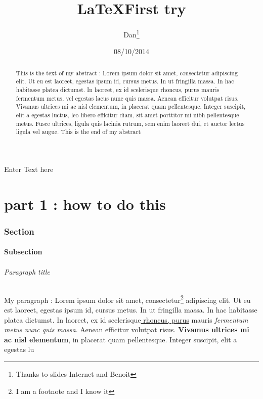 \documentclass[12pt]{article}
\title{\LaTeX First try}
\author{Dan\thanks{Thanks to slides Internet and Benoit}}
\date{08/10/2014}
\begin{document}
\maketitle
\begin{abstract}
This is the text of my abstract :
Lorem ipsum dolor sit amet, consectetur adipiscing elit. Ut eu est laoreet, egestas ipsum id, cursus metus. In ut fringilla massa. In hac habitasse platea dictumst. In laoreet, ex id scelerisque rhoncus, purus mauris fermentum metus, vel egestas lacus nunc quis massa. Aenean efficitur volutpat risus. Vivamus ultrices mi ac nisl elementum, in placerat quam pellentesque. Integer suscipit, elit a egestas luctus, leo libero efficitur diam, sit amet porttitor mi nibh pellentesque metus. Fusce ultrices, ligula quis lacinia rutrum, sem enim laoreet dui, et auctor lectus ligula vel augue.\newline
This is the end of my abstract
\end{abstract}

Enter Text here

\newpage
\tableofcontents
\newpage

\part{part 1 : how to do this}
\section{Section}
\subsection{Subsection}
\paragraph{Paragraph title}

My paragraph : Lorem ipsum dolor sit amet, consectetur\footnote{I am a footnote and I know it} adipiscing elit. Ut eu est laoreet, egestas ipsum id, cursus metus. In ut fringilla massa. In hac habitasse platea dictumst. In laoreet, ex id scelerisque\underline{ rhoncus, purus} mauris \textit{fermentum metus nunc quis massa}. Aenean efficitur volutpat risus. \textbf{Vivamus ultrices mi ac nisl elementum}, in placerat quam pellentesque. Integer suscipit, elit a egestas lu  \cite{cc} 
\end{document}
